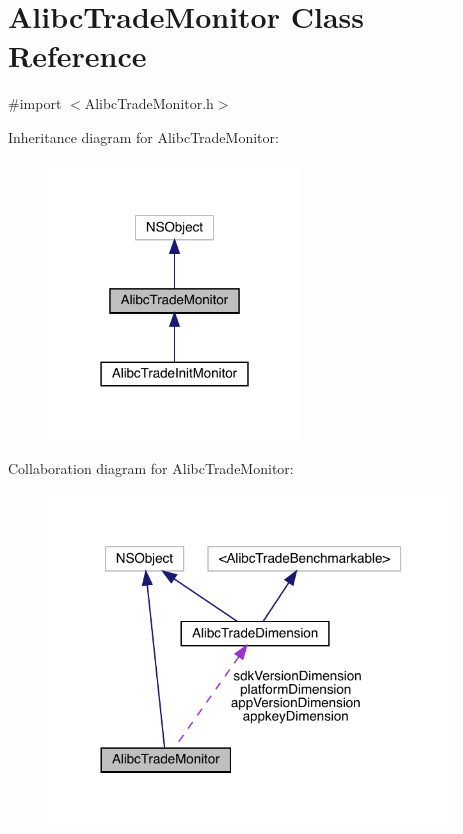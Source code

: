 \hypertarget{interface_alibc_trade_monitor}{}\section{Alibc\+Trade\+Monitor Class Reference}
\label{interface_alibc_trade_monitor}


{\ttfamily \#import $<$Alibc\+Trade\+Monitor.\+h$>$}



Inheritance diagram for Alibc\+Trade\+Monitor\+:\nopagebreak
\begin{figure}[H]
\begin{center}
\leavevmode
\includegraphics[width=190pt]{interface_alibc_trade_monitor__inherit__graph}
\end{center}
\end{figure}


Collaboration diagram for Alibc\+Trade\+Monitor\+:\nopagebreak
\begin{figure}[H]
\begin{center}
\leavevmode
\includegraphics[width=305pt]{interface_alibc_trade_monitor__coll__graph}
\end{center}
\end{figure}
